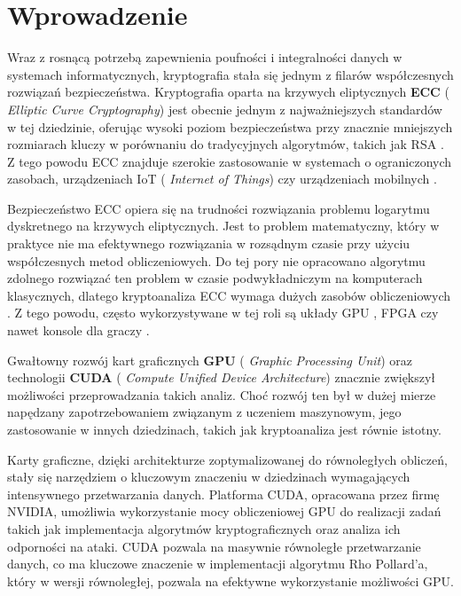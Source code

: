 \newpage
\section{Wprowadzenie}

Wraz z rosnącą potrzebą zapewnienia poufności i integralności danych w systemach
informatycznych, kryptografia stała się jednym z filarów współczesnych rozwiązań
bezpieczeństwa. Kryptografia oparta na krzywych eliptycznych \textbf{ECC} ( \textit{Elliptic Curve Cryptography}) jest
obecnie jednym z najważniejszych standardów w tej dziedzinie, oferując wysoki
poziom bezpieczeństwa przy znacznie mniejszych rozmiarach kluczy w porównaniu
do tradycyjnych algorytmów, takich jak RSA \cite[]{Ao2016,Barker2016}.
Z tego powodu ECC znajduje szerokie zastosowanie w systemach o ograniczonych zasobach,
urządzeniach IoT ( \textit{Internet of Things}) czy urządzeniach mobilnych \cite[]{Thakur2022,Hammi2020}.

Bezpieczeństwo ECC opiera się na trudności rozwiązania problemu logarytmu
dyskretnego na krzywych eliptycznych. Jest to problem matematyczny, który w
praktyce nie ma efektywnego rozwiązania w rozsądnym czasie przy użyciu
współczesnych metod obliczeniowych. Do tej pory nie opracowano algorytmu
zdolnego rozwiązać ten problem w czasie podwykładniczym na komputerach klasycznych, dlatego
kryptoanaliza ECC wymaga dużych zasobów obliczeniowych \cite{Menezes2001}.
Z tego powodu, często wykorzystywane w tej roli są układy GPU \cite[]{Boss2015,Panetta2017,Bernstein2012},
FPGA \cite[]{Wenger2014,Mane2011,FPGA2008,Majkowski2008}
czy nawet konsole dla graczy \cite{Bos2010}.

Gwałtowny rozwój kart graficznych \textbf{GPU} ( \textit{Graphic Processing Unit})
oraz technologii \textbf{CUDA} ( \textit{Compute Unified Device Architecture}) znacznie zwiększył możliwości
przeprowadzania takich analiz. Choć rozwój ten był w dużej mierze napędzany
zapotrzebowaniem związanym z uczeniem maszynowym, jego zastosowanie w
innych dziedzinach, takich jak kryptoanaliza jest równie istotny.

Karty graficzne, dzięki architekturze zoptymalizowanej do równoległych obliczeń,
stały się narzędziem o kluczowym znaczeniu w dziedzinach wymagających intensywnego
przetwarzania danych. Platforma CUDA, opracowana przez firmę NVIDIA, umożliwia
wykorzystanie mocy obliczeniowej GPU do realizacji zadań takich jak
implementacja algorytmów kryptograficznych oraz analiza ich odporności na ataki.
CUDA pozwala na masywnie równoległe przetwarzanie danych, co ma kluczowe znaczenie
w implementacji algorytmu Rho Pollard'a, który w wersji równoległej, pozwala na efektywne
wykorzystanie możliwości GPU.

